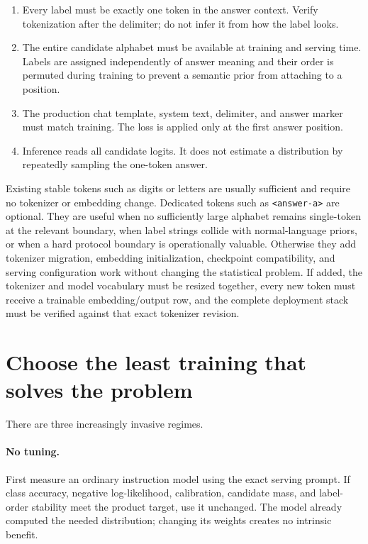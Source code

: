 \documentclass[11pt]{article}
\begin{document}
\begin{enumerate}
\item Every label must be exactly one token in the answer context.  Verify
tokenization after the delimiter; do not infer it from how the label looks.
\item The entire candidate alphabet must be available at training and
serving time.  Labels are assigned independently of answer meaning and their
order is permuted during training to prevent a semantic prior from attaching
to a position.
\item The production chat template, system text, delimiter, and answer marker
must match training.  The loss is applied only at the first answer position.
\item Inference reads all candidate logits.  It does not estimate a
distribution by repeatedly sampling the one-token answer.
\end{enumerate}

Existing stable tokens such as digits or letters are usually sufficient and
require no tokenizer or embedding change.  Dedicated tokens such as
\texttt{<answer-a>} are optional.  They are useful when no sufficiently large
alphabet remains single-token at the relevant boundary, when label strings
collide with normal-language priors, or when a hard protocol boundary is
operationally valuable.  Otherwise they add tokenizer migration, embedding
initialization, checkpoint compatibility, and serving configuration work
without changing the statistical problem.  If added, the tokenizer and
model vocabulary must be resized together, every new token must receive a
trainable embedding/output row, and the complete deployment stack must be
verified against that exact tokenizer revision.

\section{Choose the least training that solves the problem}

There are three increasingly invasive regimes.

\paragraph{No tuning.}
First measure an ordinary instruction model using the exact serving prompt.
If class accuracy, negative log-likelihood, calibration, candidate mass, and
label-order stability meet the product target, use it unchanged.  The model
already computed the needed distribution; changing its weights creates no
intrinsic benefit.
\end{document}

